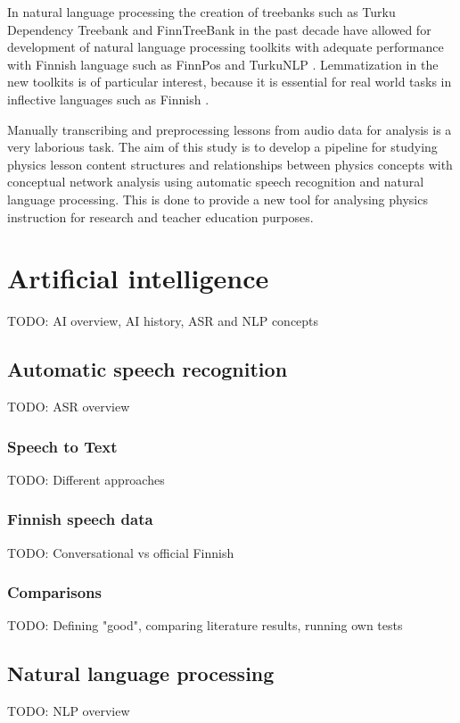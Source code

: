 \documentclass[utf8,english]{gradu3}
\begin{document}
In natural language processing the creation of treebanks such as Turku Dependency Treebank and FinnTreeBank in the past decade have allowed for development of natural language processing toolkits with adequate performance with Finnish language such as FinnPos \parencite{silfverberg2016finnpos} and TurkuNLP \parencite{kanerva2018turku}. Lemmatization in the new toolkits is of particular interest, because it is essential for real world tasks in inflective languages such as Finnish \parencite{kanerva2018turku}.

Manually transcribing and preprocessing lessons from audio data for analysis is a very laborious task. The aim of this study is to develop a pipeline for studying physics lesson content structures and relationships between physics concepts with conceptual network analysis using automatic speech recognition and natural language processing. This is done to provide a new tool for analysing physics instruction for research and teacher education purposes. 

\chapter{Artificial intelligence}
TODO: AI overview, AI history, ASR and NLP concepts

\section{Automatic speech recognition}
TODO: ASR overview \parencite{spille2018comparing, enarvi2018modeling} 

\subsection{Speech to Text}
TODO: Different approaches

\subsection{Finnish speech data}
TODO: Conversational vs official Finnish

\subsection{Comparisons}
TODO: Defining "good", comparing literature results, running own tests

\section{Natural language processing}
TODO: NLP overview \parencite{silfverberg2016finnpos, kanerva2018turku}
\end{document}
